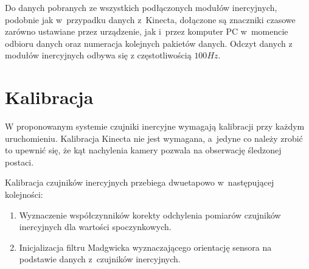 Do danych pobranych ze wszystkich podłączonych modułów inercyjnych, podobnie jak w~przypadku danych z~Kinecta, dołączone są znaczniki czasowe zarówno ustawiane przez urządzenie, jak i~przez komputer PC w~momencie odbioru danych oraz numeracja kolejnych pakietów danych. Odczyt danych z modułów inercyjnych odbywa się z częstotliwością $100Hz$.
		
\section{Kalibracja}
W proponowanym systemie czujniki inercyjne wymagają kalibracji przy każdym uruchomieniu. Kalibracja Kinecta nie jest wymagana, a~jedyne co należy zrobić to upewnić się, że kąt nachylenia kamery pozwala na obserwację śledzonej postaci.
		
Kalibracja czujników inercyjnych przebiega dwuetapowo w~następującej kolejności:
\begin{enumerate}
	\item {Wyznaczenie współczynników korekty odchylenia pomiarów czujników inercyjnych dla wartości spoczynkowych.} 
	\item {Inicjalizacja filtru Madgwicka wyznaczającego orientację sensora na podstawie danych z~czujników inercyjnych.}
\end{enumerate}
		
